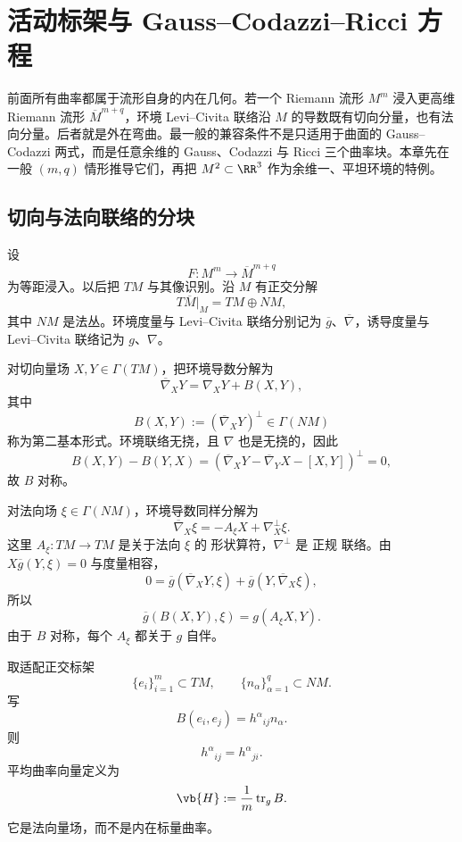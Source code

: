 \chapter{活动标架与 Gauss--Codazzi--Ricci 方程}

前面所有曲率都属于流形自身的内在几何。若一个 Riemann 流形 $M^m$ 浸入更高维 Riemann 流形 $\overline M^{m+q}$，环境 Levi--Civita 联络沿 $M$ 的导数既有切向分量，也有法向分量。后者就是外在弯曲。最一般的兼容条件不是只适用于曲面的 Gauss--Codazzi 两式，而是任意余维的 Gauss、Codazzi 与 Ricci 三个曲率块。本章先在一般 $(m,q)$ 情形推导它们，再把 $M^2\subset\RR^3$ 作为余维一、平坦环境的特例。

\section{切向与法向联络的分块}

设
\[
F:M^m\longrightarrow\overline M^{m+q}
\]
为等距浸入。以后把 $TM$ 与其像识别。沿 $M$ 有正交分解
\[
T\overline M|_M=TM\oplus NM,
\]
其中 $NM$ 是法丛。环境度量与 Levi--Civita 联络分别记为 $\overline g$、$\overline\nabla$，诱导度量与 Levi--Civita 联络记为 $g$、$\nabla$。

对切向量场 $X,Y\in\Gamma(TM)$，把环境导数分解为
\begin{equation*}{
\overline\nabla_XY
=\nabla_XY+B(X,Y),}
\end{equation*}
其中
\[
B(X,Y):=(\overline\nabla_XY)^\perp\in\Gamma(NM)
\]
称为第二基本形式。环境联络无挠，且 $\nabla$ 也是无挠的，因此
\[
B(X,Y)-B(Y,X)
=(\overline\nabla_XY-\overline\nabla_YX-[X,Y])^\perp=0,
\]
故 $B$ 对称。

对法向场 $\xi\in\Gamma(NM)$，环境导数同样分解为
\begin{equation*}{
\overline\nabla_X\xi
=-A_\xi X+\nabla_X^\perp\xi.}
\end{equation*}
这里 $A_\xi:TM\to TM$ 是关于法向 $\xi$ 的 形状算符，$\nabla^\perp$ 是 正规 联络。由 $X\overline g(Y,\xi)=0$ 与度量相容，
\[
0=\overline g(\overline\nabla_XY,\xi)
+\overline g(Y,\overline\nabla_X\xi),
\]
所以
\begin{equation}\label{eq:math-dg-shape-second-form-relation}
{
\overline g(B(X,Y),\xi)
=g(A_\xi X,Y).}
\end{equation}
由于 $B$ 对称，每个 $A_\xi$ 都关于 $g$ 自伴。

取适配正交标架
\[
\{e_i\}_{i=1}^m\subset TM,
\qquad
\{n_\alpha\}_{\alpha=1}^q\subset NM.
\]
写
\[
B(e_i,e_j)=h^\alpha{}_{ij}n_\alpha.
\]
则
\[
h^\alpha{}_{ij}=h^\alpha{}_{ji}.
\]
平均曲率向量定义为
\begin{equation*}\vb{H}
:=\frac1m\operatorname{tr}_gB.
\end{equation*}
它是法向量场，而不是内在标量曲率。




